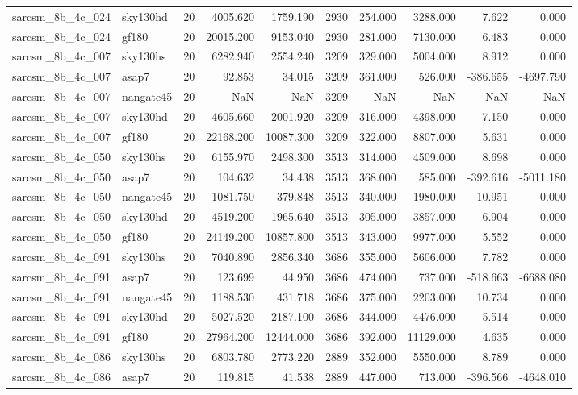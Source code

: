 \begin{tabular}{llrrrrrrrr}
sarcsm\_8b\_4c\_024 & sky130hd & 20 & 4005.620 & 1759.190 & 2930 & 254.000 & 3288.000 & 7.622 & 0.000 \\
sarcsm\_8b\_4c\_024 & gf180 & 20 & 20015.200 & 9153.040 & 2930 & 281.000 & 7130.000 & 6.483 & 0.000 \\
sarcsm\_8b\_4c\_007 & sky130hs & 20 & 6282.940 & 2554.240 & 3209 & 329.000 & 5004.000 & 8.912 & 0.000 \\
sarcsm\_8b\_4c\_007 & asap7 & 20 & 92.853 & 34.015 & 3209 & 361.000 & 526.000 & -386.655 & -4697.790 \\
sarcsm\_8b\_4c\_007 & nangate45 & 20 & NaN & NaN & 3209 & NaN & NaN & NaN & NaN \\
sarcsm\_8b\_4c\_007 & sky130hd & 20 & 4605.660 & 2001.920 & 3209 & 316.000 & 4398.000 & 7.150 & 0.000 \\
sarcsm\_8b\_4c\_007 & gf180 & 20 & 22168.200 & 10087.300 & 3209 & 322.000 & 8807.000 & 5.631 & 0.000 \\
sarcsm\_8b\_4c\_050 & sky130hs & 20 & 6155.970 & 2498.300 & 3513 & 314.000 & 4509.000 & 8.698 & 0.000 \\
sarcsm\_8b\_4c\_050 & asap7 & 20 & 104.632 & 34.438 & 3513 & 368.000 & 585.000 & -392.616 & -5011.180 \\
sarcsm\_8b\_4c\_050 & nangate45 & 20 & 1081.750 & 379.848 & 3513 & 340.000 & 1980.000 & 10.951 & 0.000 \\
sarcsm\_8b\_4c\_050 & sky130hd & 20 & 4519.200 & 1965.640 & 3513 & 305.000 & 3857.000 & 6.904 & 0.000 \\
sarcsm\_8b\_4c\_050 & gf180 & 20 & 24149.200 & 10857.800 & 3513 & 343.000 & 9977.000 & 5.552 & 0.000 \\
sarcsm\_8b\_4c\_091 & sky130hs & 20 & 7040.890 & 2856.340 & 3686 & 355.000 & 5606.000 & 7.782 & 0.000 \\
sarcsm\_8b\_4c\_091 & asap7 & 20 & 123.699 & 44.950 & 3686 & 474.000 & 737.000 & -518.663 & -6688.080 \\
sarcsm\_8b\_4c\_091 & nangate45 & 20 & 1188.530 & 431.718 & 3686 & 375.000 & 2203.000 & 10.734 & 0.000 \\
sarcsm\_8b\_4c\_091 & sky130hd & 20 & 5027.520 & 2187.100 & 3686 & 344.000 & 4476.000 & 5.514 & 0.000 \\
sarcsm\_8b\_4c\_091 & gf180 & 20 & 27964.200 & 12444.000 & 3686 & 392.000 & 11129.000 & 4.635 & 0.000 \\
sarcsm\_8b\_4c\_086 & sky130hs & 20 & 6803.780 & 2773.220 & 2889 & 352.000 & 5550.000 & 8.789 & 0.000 \\
sarcsm\_8b\_4c\_086 & asap7 & 20 & 119.815 & 41.538 & 2889 & 447.000 & 713.000 & -396.566 & -4648.010 \\

\end{tabular}
